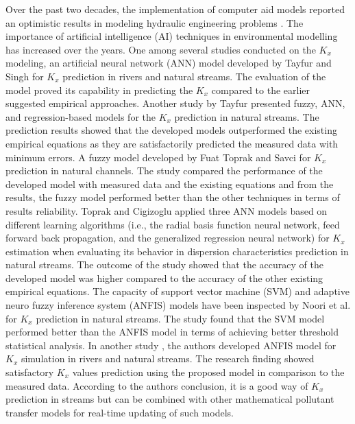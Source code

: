 \documentclass[a4paper,12pt, english]{article}
\begin{document}
Over the past two decades, the implementation of computer aid models reported an optimistic results in modeling hydraulic engineering problems \cite{sharafati2019application}. The importance of artificial intelligence (AI) techniques in environmental modelling has increased over the years. One among several studies conducted on the $K_x$ modeling, an artificial neural network (ANN) model developed by Tayfur and Singh \cite{tayfur2005predicting} for $K_x$ prediction in rivers and natural streams. The evaluation of the model proved its capability in predicting the $K_x$ compared to the earlier suggested empirical approaches. Another study by Tayfur \cite{tayfur2006fuzzy} presented fuzzy, ANN, and regression-based models for the $K_x$ prediction in natural streams. The prediction results showed that the developed models outperformed the existing empirical equations as they are satisfactorily predicted the measured data with minimum errors.
A fuzzy model developed by Fuat Toprak and Savci \cite{fuat2007longitudinal} for $K_x$ prediction in natural channels. The study compared the performance of the developed model with measured data and the existing equations and from the results, the fuzzy model performed better than the other techniques in terms of results reliability. Toprak and Cigizoglu \cite{toprak2008predicting} applied three ANN models based on different learning algorithms (i.e., the radial basis function neural network, feed forward back propagation, and the generalized regression neural network) for $K_x$ estimation when evaluating its behavior in dispersion characteristics prediction in natural streams. The outcome of the study showed that the accuracy of the developed model was higher compared to the accuracy of the other existing empirical equations. The capacity of support vector machine (SVM) and adaptive neuro fuzzy inference system (ANFIS) models have been inspected by Noori et al. \cite{noori2009predicting} for $K_x$ prediction in natural streams. The study found that the SVM model performed better than the ANFIS model in terms of achieving better threshold statistical analysis. In another study \cite{riahi2009expert}, the authors developed ANFIS model for $K_x$ simulation in rivers and natural streams. The research finding showed satisfactory $K_x$ values prediction using the proposed model in comparison to the measured data. According to the authors conclusion, it is a good way of $K_x$ prediction in streams but can be combined with other mathematical pollutant transfer models for real-time updating of such models.
\end{document}
